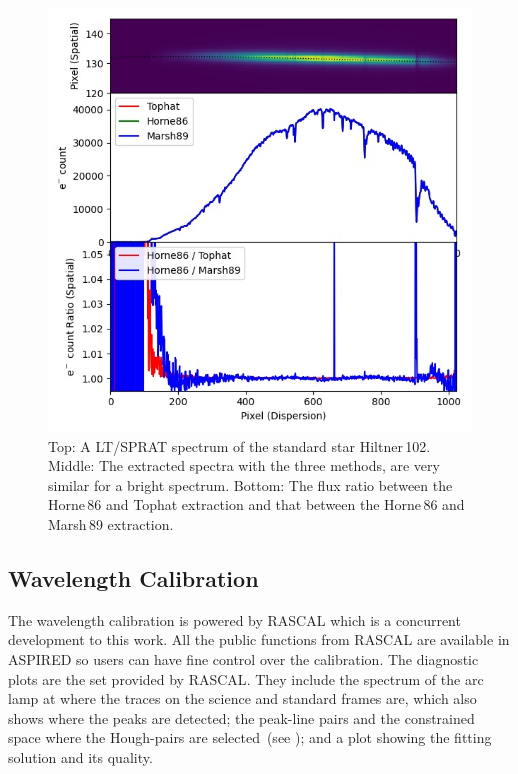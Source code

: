 \documentclass[fleqn,usenatbib]{mnras}
\begin{document}
\begin{figure}
    \centering
    \includegraphics[width=\columnwidth]{fig_04_extraction_compared.jpg}
    \caption{Top: A LT/SPRAT spectrum of the standard star Hiltner\,102.
    Middle: The extracted spectra with the three methods, are very
    similar for a bright spectrum. Bottom: The flux ratio between the
    Horne\,86 and Tophat extraction and that between the Horne\,86 and
    Marsh\,89 extraction.}
    \label{fig:extract}
\end{figure}

\subsection{Wavelength Calibration}
The wavelength calibration is powered by \textsc{RASCAL} which
is a concurrent development to this work. All the public
functions from \textsc{RASCAL} are available in \textsc{ASPIRED}
so users can have fine control over the calibration. The
diagnostic plots are the set provided by \textsc{RASCAL}.
They include the spectrum of the arc lamp at where the traces
on the science and standard frames are, which also shows where
the peaks are detected; the peak-line pairs and the constrained
space where the Hough-pairs are
selected~(see \citealt{2020ASPC..527..627V}); and a plot showing
the fitting solution and its quality.
\end{document}

